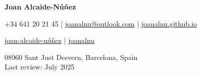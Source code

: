 \documentclass[a4paper,11pt]{article}
\newcommand{\socialicon}[1]{\raisebox{-0.05em}{\resizebox{!}{1em}{#1}}}
\newcommand{\headerfontiii}{\fontfamily{ppl}\selectfont} %
\begin{document}
\headerfontiii

\begin{center}
    {\Huge\textbf{Joan Alcaide-Núñez}}
\end{center}
\vspace{-4mm}

\begin{center}
    \small{
     +34 641 20 21 45 |  \href{mailto:joanalnu@outlook.com}{joanalnu@outlook.com} |  \href{https://joanalnu.github.io}{joanalnu.github.io}
    }
\end{center}
\vspace{-6mm}

\begin{center}
    \small{
    \socialicon{\faLinkedin} \href{https://www.linkedin.com/in/joan-alcaide-núñez}{joan-alcaide-núñez} | 
    \socialicon{\faGithub} \href{https://github.com/joanalnu}{joanalnu}%
    
    }
\end{center}
\vspace{-6mm}
\begin{center}
    \small{08960 Sant Just Desvern, Barcelona, Spain}\\
    \small{Last review: July 2025}
\end{center}

\vspace{-4mm}
\end{document}
